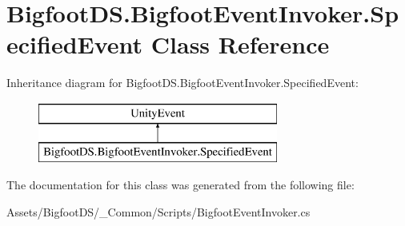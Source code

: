 \hypertarget{class_bigfoot_d_s_1_1_bigfoot_event_invoker_1_1_specified_event}{}\section{Bigfoot\+D\+S.\+Bigfoot\+Event\+Invoker.\+Specified\+Event Class Reference}
\label{class_bigfoot_d_s_1_1_bigfoot_event_invoker_1_1_specified_event}
Inheritance diagram for Bigfoot\+D\+S.\+Bigfoot\+Event\+Invoker.\+Specified\+Event\+:\begin{figure}[H]
\begin{center}
\leavevmode
\includegraphics[height=2.000000cm]{class_bigfoot_d_s_1_1_bigfoot_event_invoker_1_1_specified_event}
\end{center}
\end{figure}


The documentation for this class was generated from the following file\+:\begin{DoxyCompactItemize}
\item 
Assets/\+Bigfoot\+D\+S/\+\_\+\+Common/\+Scripts/Bigfoot\+Event\+Invoker.\+cs\end{DoxyCompactItemize}
